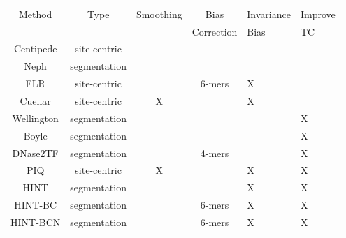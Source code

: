 \documentclass[11pt]{article}
\begin{document}
\begin{table}[h]
\begin{center}
\label{tab:summary}
\renewcommand{\arraystretch}{1.2}
\begin{tabularx}{\textwidth}{ cccc|XX }
\hline
Method     & Type         & Smoothing & Bias        & Invariance & Improve \\
           &              &          & Correction  & Bias       & TC      \\
\hline
Centipede  & site-centric &          &             &            &         \\
Neph       & segmentation &          &             &            &         \\
FLR        & site-centric &          & 6-mers      & X          &         \\
Cuellar    & site-centric & X        &             & X          &         \\
Wellington & segmentation &          &             &            & X       \\
Boyle      & segmentation &          &             &            & X       \\
DNase2TF   & segmentation &          & 4-mers      &            & X       \\
PIQ        & site-centric & X        &             & X          & X       \\
HINT       & segmentation &          &             & X          & X       \\
HINT-BC    & segmentation &          & 6-mers      & X          & X       \\
HINT-BCN   & segmentation &          & 6-mers      & X          & X       \\
\hline
\end{tabularx}
\end{center}
\end{table}

\clearpage
\end{document}
